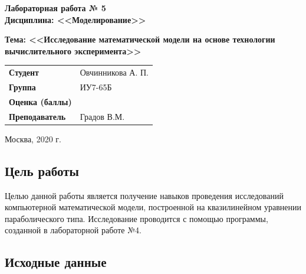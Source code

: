 \documentclass[a4paper,14pt]{article}
\begin{document}
\begin{titlepage}
    \vspace{3cm}

    \begin{center}
		\textbf{Лабораторная работа № 5} \\
		\textbf{Дисциплина: <<Моделирование>>}
        \vspace{0.5cm}
	\end{center}

	\begin{center}
		\textbf{Тема: <<Исследование математической модели на основе технологии вычислительного эксперимента>>}
        \vspace{0.5cm}
    \end{center}

    \vspace{2cm}

	\begin{flushleft}
        \begin{tabular}{ll}
            \textbf{Студент} & Овчинникова А. П. \\
            \textbf{Группа} & ИУ7-65Б \\
            \textbf{Оценка (баллы)} & \\
            \textbf{Преподаватель} & Градов В.М.   \\
        \end{tabular}
    \end{flushleft}

    \vspace{2cm}

   \begin{center}
        Москва, 2020 г.
    \end{center}

\end{titlepage}

\setcounter{page}{2}

\subsection*{Цель работы}

Целью данной работы является получение навыков проведения исследований 
компьютерной математической модели, построенной на квазилинейном
 уравнении параболического типа. Исследование проводится  
 с помощью программы, созданной   в лабораторной работе №4. 

\subsection*{Исходные данные}
\end{document}
